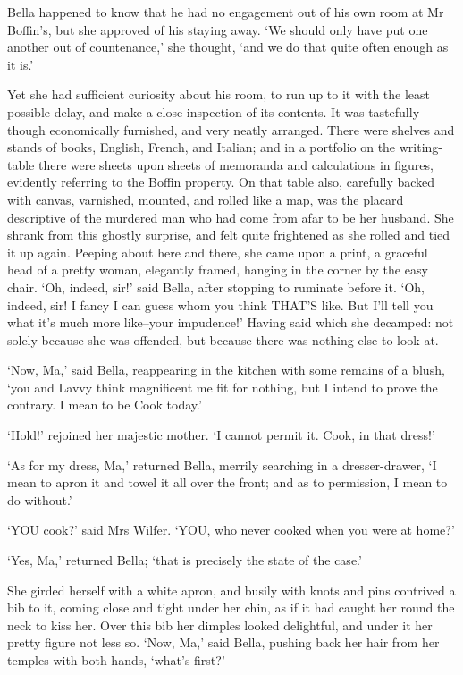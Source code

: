 Bella happened to know that he had no engagement out of his own room at
Mr Boffin’s, but she approved of his staying away. ‘We should only have
put one another out of countenance,’ she thought, ‘and we do that quite
often enough as it is.’

Yet she had sufficient curiosity about his room, to run up to it with
the least possible delay, and make a close inspection of its contents.
It was tastefully though economically furnished, and very neatly
arranged. There were shelves and stands of books, English, French, and
Italian; and in a portfolio on the writing-table there were sheets upon
sheets of memoranda and calculations in figures, evidently referring to
the Boffin property. On that table also, carefully backed with canvas,
varnished, mounted, and rolled like a map, was the placard descriptive
of the murdered man who had come from afar to be her husband. She shrank
from this ghostly surprise, and felt quite frightened as she rolled and
tied it up again. Peeping about here and there, she came upon a print, a
graceful head of a pretty woman, elegantly framed, hanging in the corner
by the easy chair. ‘Oh, indeed, sir!’ said Bella, after stopping to
ruminate before it. ‘Oh, indeed, sir! I fancy I can guess whom you
think THAT’S like. But I’ll tell you what it’s much more like--your
impudence!’ Having said which she decamped: not solely because she was
offended, but because there was nothing else to look at.

‘Now, Ma,’ said Bella, reappearing in the kitchen with some remains of a
blush, ‘you and Lavvy think magnificent me fit for nothing, but I intend
to prove the contrary. I mean to be Cook today.’

‘Hold!’ rejoined her majestic mother. ‘I cannot permit it. Cook, in that
dress!’

‘As for my dress, Ma,’ returned Bella, merrily searching in a
dresser-drawer, ‘I mean to apron it and towel it all over the front; and
as to permission, I mean to do without.’

‘YOU cook?’ said Mrs Wilfer. ‘YOU, who never cooked when you were at
home?’

‘Yes, Ma,’ returned Bella; ‘that is precisely the state of the case.’

She girded herself with a white apron, and busily with knots and pins
contrived a bib to it, coming close and tight under her chin, as if it
had caught her round the neck to kiss her. Over this bib her dimples
looked delightful, and under it her pretty figure not less so. ‘Now,
Ma,’ said Bella, pushing back her hair from her temples with both hands,
‘what’s first?’

